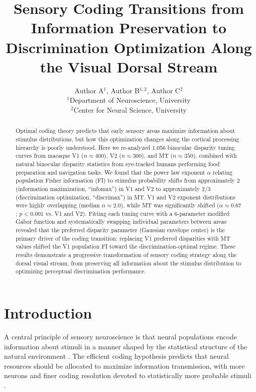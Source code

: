 \documentclass[11pt]{article}
\title{Sensory Coding Transitions from Information Preservation to Discrimination Optimization Along the Visual Dorsal Stream}
\author{Author A$^{1}$, Author B$^{1,2}$, Author C$^{2}$ \\
\small $^{1}$Department of Neuroscience, University \\
\small $^{2}$Center for Neural Science, University}
\date{}
\begin{document}
\maketitle

\begin{abstract}
Optimal coding theory predicts that early sensory areas maximize information about stimulus distributions, but how this optimization changes along the cortical processing hierarchy is poorly understood. Here we re-analyzed 1,056 binocular disparity tuning curves from macaque V1 ($n \approx 400$), V2 ($n \approx 300$), and MT ($n \approx 350$), combined with natural binocular disparity statistics from eye-tracked humans performing food preparation and navigation tasks. We found that the power law exponent $\alpha$ relating population Fisher information (FI) to stimulus probability shifts from approximately 2 (information maximization, ``infomax'') in V1 and V2 to approximately 2/3 (discrimination optimization, ``discrimax'') in MT. V1 and V2 exponent distributions were highly overlapping (median $\alpha \approx 2.0$), while MT was significantly shifted ($\alpha \approx 0.67$; $p < 0.001$ vs. V1 and V2). Fitting each tuning curve with a 6-parameter modified Gabor function and systematically swapping individual parameters between areas revealed that the preferred disparity parameter (Gaussian envelope center) is the primary driver of the coding transition: replacing V1 preferred disparities with MT values shifted the V1 population FI toward the discrimination-optimal regime. These results demonstrate a progressive transformation of sensory coding strategy along the dorsal visual stream, from preserving all information about the stimulus distribution to optimizing perceptual discrimination performance.
\end{abstract}

\section{Introduction}

A central principle of sensory neuroscience is that neural populations encode information about stimuli in a manner shaped by the statistical structure of the natural environment \citep{barlow1961coding, attneave1954informational, simoncelli2001natural}. The efficient coding hypothesis predicts that neural resources should be allocated to maximize information transmission, with more neurons and finer coding resolution devoted to statistically more probable stimuli \citep{laughlin1981simple}.
\end{document}
